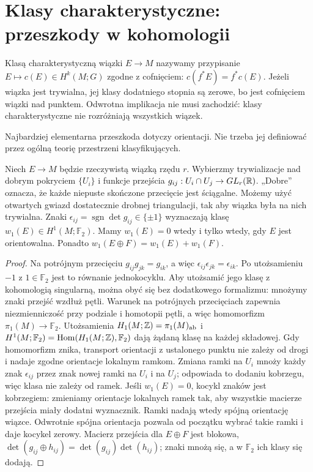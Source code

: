 \section{Klasy charakterystyczne: przeszkody w kohomologii}
\label{sec:klasy-char-16}

\begin{definicja}
Klasą charakterystyczną
wiązki $E\to M$ nazywamy
przypisanie $E\mapsto c(E)
\in H^k(M;G)$ zgodne
z cofnięciem:
$c(f^*E)=f^*c(E)$.
Jeżeli wiązka jest trywialna,
jej klasy dodatniego stopnia
są zerowe, bo jest cofnięciem
wiązki nad punktem.
Odwrotna implikacja
nie musi zachodzić:
klasy charakterystyczne
nie rozróżniają wszystkich
wiązek.
\end{definicja}

Najbardziej elementarna
przeszkoda dotyczy
orientacji. Nie trzeba
jej definiować przez
ogólną teorię przestrzeni
klasyfikujących.

\begin{stwierdzenie}
\label{prop:w1-orientacja-16}
Niech $E\to M$ będzie
rzeczywistą wiązką
rzędu $r$. Wybierzmy
trywializacje nad dobrym
pokryciem $\{U_i\}$ i
funkcje przejścia
$g_{ij}:U_i\cap U_j\to GL_r(\mathbb{R})$.
„Dobre” oznacza, że każde niepuste skończone przecięcie
jest ściągalne. Możemy użyć otwartych gwiazd dostatecznie
drobnej triangulacji, tak aby wiązka była na nich trywialna.
Znaki
$\epsilon_{ij}=\operatorname{sgn}
\det g_{ij}\in\{\pm1\}$
wyznaczają klasę
$w_1(E)\in H^1(M;\mathbb F_2)$.
Mamy $w_1(E)=0$
wtedy i tylko wtedy,
gdy $E$ jest orientowalna.
Ponadto
$w_1(E\oplus F)=w_1(E)+w_1(F)$.
\end{stwierdzenie}
\begin{proof}
Na potrójnym przecięciu
$g_{ij}g_{jk}=g_{ik}$,
a więc
$\epsilon_{ij}\epsilon_{jk}
=\epsilon_{ik}$.
Po utożsamieniu $-1$
z $1\in\mathbb F_2$
jest to równanie jednokocyklu. Aby utożsamić jego
klasę z kohomologią singularną, można obyć się
bez dodatkowego formalizmu: mnożymy znaki przejść
wzdłuż pętli. Warunek na potrójnych przecięciach
zapewnia niezmienniczość przy podziale i homotopii
pętli, a więc homomorfizm $\pi_1(M)\to\mathbb F_2$.
Utożsamienia $H_1(M;\mathbb{Z})=\pi_1(M)_{\mathrm{ab}}$
i $H^1(M;\mathbb F_2)=\operatorname{Hom}(H_1(M;\mathbb{Z}),\mathbb F_2)$
dają żądaną klasę na każdej składowej. Gdy homomorfizm
znika, transport orientacji z ustalonego punktu nie
zależy od drogi i nadaje zgodne orientacje lokalnym ramkom.
Zmiana
ramki na $U_i$ mnoży
każdy znak $\epsilon_{ij}$
przez znak nowej ramki
na $U_i$ i na $U_j$;
odpowiada to dodaniu
kobrzegu, więc klasa
nie zależy od ramek.
Jeśli $w_1(E)=0$,
kocykl znaków jest
kobrzegiem: zmieniamy
orientacje lokalnych
ramek tak, aby wszystkie
macierze przejścia
miały dodatni wyznacznik.
Ramki nadają wtedy
spójną orientację
wiązce. Odwrotnie
spójna orientacja
pozwala od początku
wybrać takie ramki
i daje kocykel zerowy.
Macierz przejścia
dla $E\oplus F$
jest blokowa,
$\det(g_{ij}\oplus h_{ij})
=\det(g_{ij})\det(h_{ij})$;
znaki mnożą się, a
w $\mathbb F_2$
ich klasy się dodają.
\end{proof}

